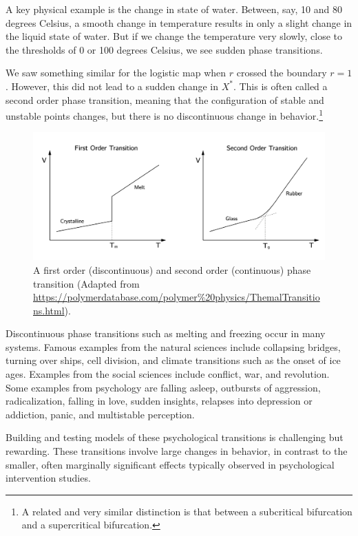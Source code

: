 \documentclass[
  a4paper,
  DIV=11,
  numbers=noendperiod]{scrreprt}
\begin{document}
A key physical example is the change in state of water. Between, say, 10
and 80 degrees Celsius, a smooth change in temperature results in only a
slight change in the liquid state of water. But if we change the
temperature very slowly, close to the thresholds of 0 or 100 degrees
Celsius, we see sudden phase transitions.

We saw something similar for the logistic map when \(r\) crossed the
boundary \(r = 1\). However, this did not lead to a sudden change in
\(X^{*}\). This is often called a second order phase transition, meaning
that the configuration of stable and unstable points changes, but there
is no discontinuous change in behavior.\footnote{A related and very
  similar distinction is that between a subcritical bifurcation and a
  supercritical bifurcation.}

\begin{figure}

{\centering \includegraphics{media/ch3/ch3-01__figure13.png}

}

\caption{\label{fig-ch3-img1-old-13}A first order (discontinuous) and
second order (continuous) phase transition (Adapted from
\url{https://polymerdatabase.com/polymer\%20physics/ThemalTransitions.html}).}

\end{figure}

Discontinuous phase transitions such as melting and freezing occur in
many systems. Famous examples from the natural sciences include
collapsing bridges, turning over ships, cell division, and climate
transitions such as the onset of ice ages. Examples from the social
sciences include conflict, war, and revolution. Some examples from
psychology are falling asleep, outbursts of aggression, radicalization,
falling in love, sudden insights, relapses into depression or addiction,
panic, and multistable perception.

Building and testing models of these psychological transitions is
challenging but rewarding. These transitions involve large changes in
behavior, in contrast to the smaller, often marginally significant
effects typically observed in psychological intervention studies.
\end{document}
